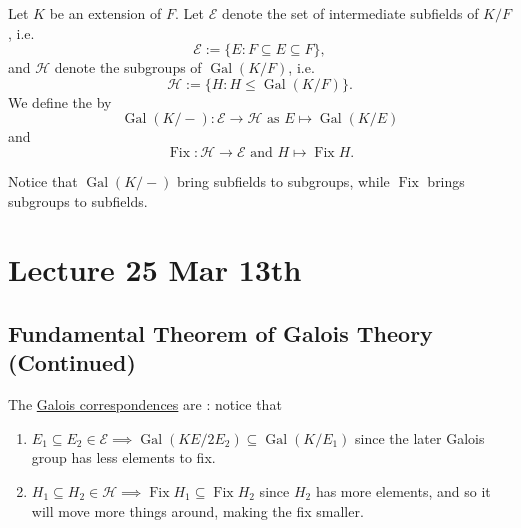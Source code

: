 \documentclass[notoc,notitlepage,nobib]{tufte-book}
\DeclareMathOperator{\Gal}{Gal}
\DeclareMathOperator{\Fix}{Fix}
\begin{document}
\begin{defn}\label{defn:galois_correspondences}
  Let $K$ be an extension of $F$. Let $\mathcal{E}$ denote the set of
  intermediate subfields of $K / F$, i.e.
  \begin{equation*}
    \mathcal{E} := \{ E : F \subseteq E \subseteq F \},
  \end{equation*}
  and $\mathcal{H}$ denote the subgroups of $\Gal(K / F)$, i.e.
  \begin{equation*}
    \mathcal{H} := \{ H : H \leq \Gal(K / F) \}.
  \end{equation*}
  We define the  by
  \begin{equation*}
    \Gal(K / -) : \mathcal{E} \to \mathcal{H} \text{ as } E \mapsto \Gal(K / E)
  \end{equation*}
  and
  \begin{equation*}
    \Fix : \mathcal{H} \to \mathcal{E} \text{ and } H \mapsto \Fix H.
  \end{equation*}
\end{defn}

\begin{note}
  Notice that $\Gal(K / -)$ bring subfields to subgroups, while $\Fix$ brings
  subgroups to subfields.
\end{note}



\chapter{Lecture 25 Mar 13th}%
\label{chp:lecture_25_mar_13th}

\section{Fundamental Theorem of Galois Theory (Continued)}%
\label{sec:fundamental_theorem_of_galois_theory_continued}

\begin{remark}
  The \hyperref[defn:galois_correspondences]{Galois correspondences} are
  : notice that
  \begin{enumerate}
    \item $E_1 \subseteq E_2 \in \mathcal{E} \implies \Gal(KE/2E_2) \subseteq \Gal(K
      / E_1)$ since the later Galois group has less elements to fix.
    \item $H_1 \subseteq H_2 \in \mathcal{H} \implies \Fix H_1 \subseteq \Fix
      H_2$ since $H_2$ has more elements, and so it will move more things
      around, making the fix smaller.
  \end{enumerate}
\end{remark}
\end{document}
